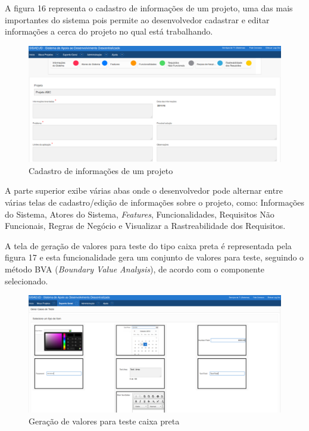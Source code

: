 A figura 16 representa o cadastro de informações de um projeto, uma das mais importantes do sistema pois permite ao desenvolvedor cadastrar e editar informações a cerca do projeto no qual está trabalhando. \clearpage

\begin{figure}[!htb]
	\hspace*{-1.5cm} 
		\includegraphics[scale=0.40]{figuras/cadastro_projeto_p14}
	\caption{Cadastro de informações de um projeto}
\end{figure}

A parte superior exibe várias abas onde o desenvolvedor pode alternar entre várias telas de cadastro/edição de informações sobre o projeto, como: Informações do Sistema, Atores do Sistema, \textit{Features}, Funcionalidades, Requisitos Não Funcionais, Regras de Negócio e Visualizar a Rastreabilidade dos Requisitos.

A tela de geração de valores para teste do tipo caixa preta é representada pela figura 17 e esta funcionalidade gera um conjunto de valores para teste, seguindo o método BVA (\textit{Boundary Value Analysis}), de acordo com o componente selecionado.\clearpage

\begin{figure}[!htb]
	\hspace*{-1.5cm} 
		\includegraphics[scale=0.40]{figuras/gerador_teste_p57}
	\caption{Geração de valores para teste caixa preta}
\end{figure}

